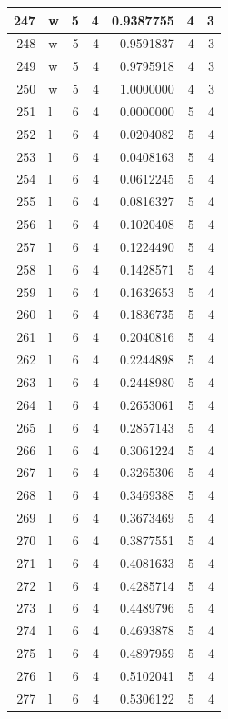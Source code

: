 \documentclass[
  letterpaper,
  DIV=11,
  numbers=noendperiod]{scrreprt}
\begin{document}
\begin{table}
\begin{tabular}[t]{r|l|r|r|r|r|r}
\hline
247 & w & 5 & 4 & 0.9387755 & 4 & 3\\
\hline
248 & w & 5 & 4 & 0.9591837 & 4 & 3\\
\hline
249 & w & 5 & 4 & 0.9795918 & 4 & 3\\
\hline
250 & w & 5 & 4 & 1.0000000 & 4 & 3\\
\hline
251 & l & 6 & 4 & 0.0000000 & 5 & 4\\
\hline
252 & l & 6 & 4 & 0.0204082 & 5 & 4\\
\hline
253 & l & 6 & 4 & 0.0408163 & 5 & 4\\
\hline
254 & l & 6 & 4 & 0.0612245 & 5 & 4\\
\hline
255 & l & 6 & 4 & 0.0816327 & 5 & 4\\
\hline
256 & l & 6 & 4 & 0.1020408 & 5 & 4\\
\hline
257 & l & 6 & 4 & 0.1224490 & 5 & 4\\
\hline
258 & l & 6 & 4 & 0.1428571 & 5 & 4\\
\hline
259 & l & 6 & 4 & 0.1632653 & 5 & 4\\
\hline
260 & l & 6 & 4 & 0.1836735 & 5 & 4\\
\hline
261 & l & 6 & 4 & 0.2040816 & 5 & 4\\
\hline
262 & l & 6 & 4 & 0.2244898 & 5 & 4\\
\hline
263 & l & 6 & 4 & 0.2448980 & 5 & 4\\
\hline
264 & l & 6 & 4 & 0.2653061 & 5 & 4\\
\hline
265 & l & 6 & 4 & 0.2857143 & 5 & 4\\
\hline
266 & l & 6 & 4 & 0.3061224 & 5 & 4\\
\hline
267 & l & 6 & 4 & 0.3265306 & 5 & 4\\
\hline
268 & l & 6 & 4 & 0.3469388 & 5 & 4\\
\hline
269 & l & 6 & 4 & 0.3673469 & 5 & 4\\
\hline
270 & l & 6 & 4 & 0.3877551 & 5 & 4\\
\hline
271 & l & 6 & 4 & 0.4081633 & 5 & 4\\
\hline
272 & l & 6 & 4 & 0.4285714 & 5 & 4\\
\hline
273 & l & 6 & 4 & 0.4489796 & 5 & 4\\
\hline
274 & l & 6 & 4 & 0.4693878 & 5 & 4\\
\hline
275 & l & 6 & 4 & 0.4897959 & 5 & 4\\
\hline
276 & l & 6 & 4 & 0.5102041 & 5 & 4\\
\hline
277 & l & 6 & 4 & 0.5306122 & 5 & 4\\

\end{tabular}
\end{table}
\end{document}
